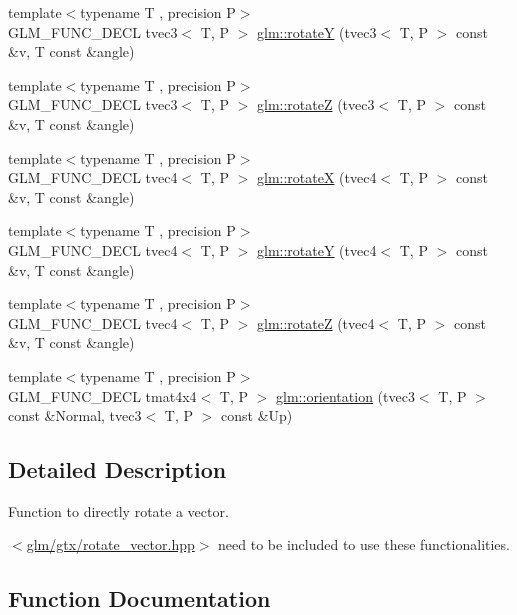 \begin{DoxyCompactItemize}
{\footnotesize template$<$typename T , precision P$>$ }\\G\+L\+M\+\_\+\+F\+U\+N\+C\+\_\+\+D\+E\+C\+L tvec3$<$ T, P $>$ \hyperlink{group__gtx__rotate__vector_gabb5d19eba5befeebcb35a0aad4a114e3}{glm\+::rotate\+Y} (tvec3$<$ T, P $>$ const \&v, T const \&angle)
\item 
{\footnotesize template$<$typename T , precision P$>$ }\\G\+L\+M\+\_\+\+F\+U\+N\+C\+\_\+\+D\+E\+C\+L tvec3$<$ T, P $>$ \hyperlink{group__gtx__rotate__vector_gae30ac01b89d4f16a972fee696c964908}{glm\+::rotate\+Z} (tvec3$<$ T, P $>$ const \&v, T const \&angle)
\item 
{\footnotesize template$<$typename T , precision P$>$ }\\G\+L\+M\+\_\+\+F\+U\+N\+C\+\_\+\+D\+E\+C\+L tvec4$<$ T, P $>$ \hyperlink{group__gtx__rotate__vector_gadab312d430a564741ae02215255027a0}{glm\+::rotate\+X} (tvec4$<$ T, P $>$ const \&v, T const \&angle)
\item 
{\footnotesize template$<$typename T , precision P$>$ }\\G\+L\+M\+\_\+\+F\+U\+N\+C\+\_\+\+D\+E\+C\+L tvec4$<$ T, P $>$ \hyperlink{group__gtx__rotate__vector_gae2507577c4bffa3548b32852791dd90c}{glm\+::rotate\+Y} (tvec4$<$ T, P $>$ const \&v, T const \&angle)
\item 
{\footnotesize template$<$typename T , precision P$>$ }\\G\+L\+M\+\_\+\+F\+U\+N\+C\+\_\+\+D\+E\+C\+L tvec4$<$ T, P $>$ \hyperlink{group__gtx__rotate__vector_ga034e5d197ab4bd8685624bc2cf16e586}{glm\+::rotate\+Z} (tvec4$<$ T, P $>$ const \&v, T const \&angle)
\item 
{\footnotesize template$<$typename T , precision P$>$ }\\G\+L\+M\+\_\+\+F\+U\+N\+C\+\_\+\+D\+E\+C\+L tmat4x4$<$ T, P $>$ \hyperlink{group__gtx__rotate__vector_ga49b4d082305cdfcfe0a5c184f684a902}{glm\+::orientation} (tvec3$<$ T, P $>$ const \&Normal, tvec3$<$ T, P $>$ const \&Up)
\end{DoxyCompactItemize}


\subsection{Detailed Description}
Function to directly rotate a vector. 

$<$\hyperlink{rotate__vector_8hpp}{glm/gtx/rotate\+\_\+vector.\+hpp}$>$ need to be included to use these functionalities. 

\subsection{Function Documentation}
\hypertarget{group__gtx__rotate__vector_ga49b4d082305cdfcfe0a5c184f684a902}{}
